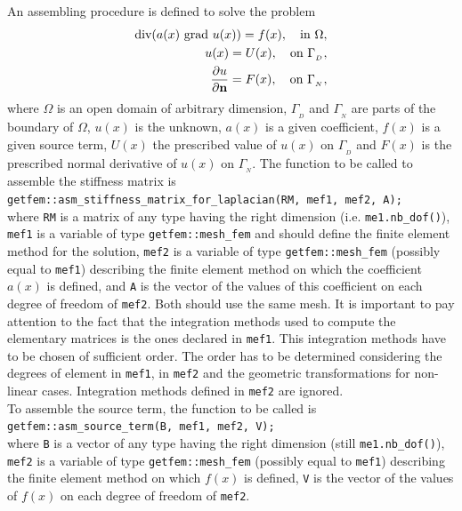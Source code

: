 \documentclass[11pt,a4paper]{article}
\begin{document}
An assembling procedure is defined to solve the problem
\begin{eqnarray*}
  \mbox{div}(a(x)\ \mbox{grad }u(x)) = f(x), \ \ \mbox{ in } \Omega, \\
  u(x) = U(x),  \ \ \mbox{ on } \Gamma_{_D}, \\
  {\displaystyle \frac{\displaystyle \partial u}{\displaystyle \partial \bf n}} = F(x),  \ \ \mbox{ on } \Gamma_{_N},   
\end{eqnarray*}
where $\Omega$ is an open domain of arbitrary dimension, $\Gamma_{_D}$ and $\Gamma_{_N}$ are parts of the boundary of $\Omega$, $u(x)$ is the unknown, $a(x)$ is a given coefficient, $f(x)$ is a given source term, $U(x)$ the prescribed value of $u(x)$ on $\Gamma_{_D}$ and $F(x)$ is the prescribed normal derivative of $u(x)$ on $\Gamma_{_N}$.
The function to be called to assemble the stiffness matrix is\\[0.5cm]
{\tt getfem::asm\_stiffness\_matrix\_for\_laplacian(RM, mef1, mef2, A);} \\[0.5cm]
where {\tt RM} is a matrix of any type having the right dimension (i.e. {\tt me1.nb\_dof()}), {\tt mef1} is a variable of type {\tt getfem::mesh\_fem} and should define the finite element method for the solution, {\tt mef2}  is a variable of type {\tt getfem::mesh\_fem} (possibly equal to {\tt mef1}) describing the finite element method on which the coefficient $a(x)$ is defined, and {\tt A} is the vector of the values of this coefficient on each degree of freedom of {\tt mef2}. Both should use the same mesh. It is important to pay attention to the fact that the integration methods used to compute the elementary matrices is the ones declared in {\tt mef1}. This integration methods have to be chosen of sufficient order. The order has to be determined considering the degrees of element in {\tt mef1}, in {\tt mef2} and the geometric transformations for non-linear cases. Integration methods defined in {\tt mef2} are ignored.\\[0.5cm]
To assemble the source term, the  function to be called is\\[0.5cm]
{\tt getfem::asm\_source\_term(B, mef1, mef2, V);} \\[0.5cm]
where {\tt B} is a vector of any type having the right dimension (still {\tt me1.nb\_dof()}), {\tt mef2}  is a variable of type {\tt getfem::mesh\_fem} (possibly equal to {\tt mef1}) describing the finite element method on which $f(x)$ is defined, {\tt V} is the vector of the values of $f(x)$ on each degree of freedom of {\tt mef2}.\\[0.5cm]
\end{document}
